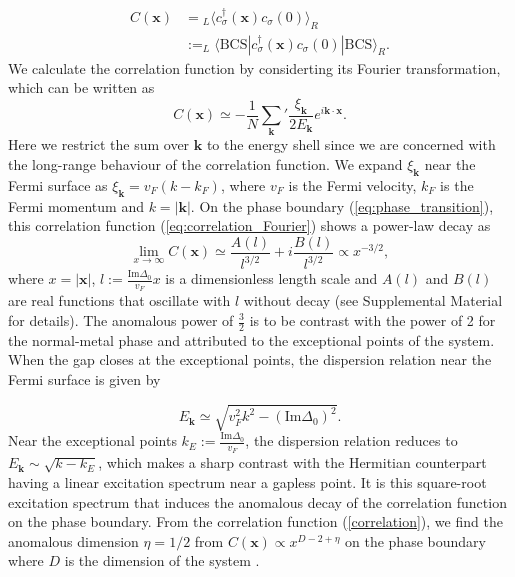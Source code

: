 \documentclass[aps,prl,twocolumn,nofootinbib,superscriptaddress,longbibliography]{revtex4-1}
\begin{document}
	\begin{align}
	C(\bm{x})&={}_{L}\langle c_{\sigma}^{\dagger}(\bm{x})c_{\sigma}(0)\rangle_{R}\nonumber\\
	&:=_{L}\langle\text{BCS}|c_{\sigma}^{\dagger}(\bm{x})c_{\sigma}(0)|\text{BCS}\rangle_{R}.
	\end{align}
 We calculate the correlation function by considerting its Fourier transformation, which can be written as
 \begin{equation}
 	C (\bm{x}) \simeq -\frac{1}{N}\sum_{\bm{k}}^{}{'} \frac{\xi_{\bm{k}}}{2 E_{\bm{k}}} e^{i\bm{k} \cdot \bm{x}}.\label{eq:correlation_Fourier}
 \end{equation}
  Here we restrict the sum over $\bm{k}$ to the energy shell since we are concerned with the long-range behaviour of the correlation function. We expand $\xi_{\bm{k}}$ near the Fermi surface as $\xi_{{\bm{k}}}=v_F(k-k_F)$, where $v_F$ is the Fermi velocity, $k_F$ is the Fermi momentum and $k=|\bm{k}|$. On the phase boundary (\ref{eq:phase_transition}), this correlation function (\ref{eq:correlation_Fourier}) shows a power-law decay as
	\begin{equation}
	\lim_{x\rightarrow\infty}C (\bm{x})\simeq\frac{A(l)}{l^{3/2}}+i\frac{B(l)}{l^{3/2}}\propto x^{-3/2},\label{correlation}
	\end{equation}
	where $x=|\bm{x}|$, $l:=\frac{\text{Im}\Delta_{0}}{v_{F}}x$ is a dimensionless length scale and $A(l)$ and $B(l)$ are real functions  that oscillate with $l$ without decay (see Supplemental Material \cite{SupplementaryMaterial} for details). The anomalous power of $\frac{3}{2}$ is to be contrast with the power of 2 for the normal-metal phase \cite{Sachdev:2011uj} and attributed to the exceptional points of the system.  When the gap closes at the exceptional points, the dispersion relation near the Fermi surface is given by
	
	\begin{equation}
	E_{\bm{k}}\simeq\sqrt{v_{F}^{2}k^{2}-(\text{Im}\Delta_{0})^{2}}.
	\end{equation}
	Near the exceptional points $k_E:=\frac{\text{Im}\Delta_{0}}{v_{F}}$,
	the dispersion relation reduces to $E_{\bm{k}}\sim\sqrt{k-k_{E}}$,
	which makes a sharp contrast with the Hermitian counterpart having a
	linear excitation spectrum near a gapless point. It is this square-root
	excitation spectrum that induces the
	anomalous decay of the correlation function on the phase boundary. From the correlation function (\ref{correlation}), we find the anomalous dimension $\eta=1/2$ from $C(\bm{x})\propto x^{D-2+\eta}$ on the phase boundary where $D$ is the dimension of the system \cite{Sachdev:2011uj}.
	
\end{document}
